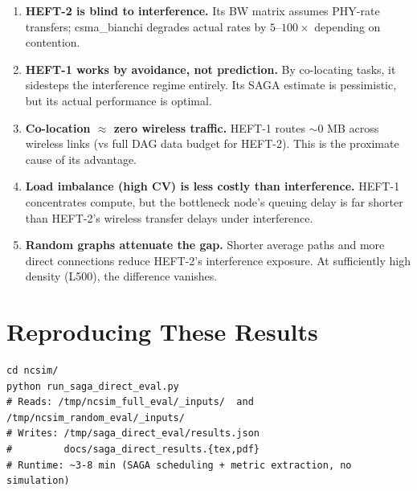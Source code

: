 \documentclass[11pt]{article}
\begin{document}
\begin{enumerate}
  \item \textbf{HEFT-2 is blind to interference.}  Its BW matrix assumes
        PHY-rate transfers; csma\_bianchi degrades actual rates by $5\text{--}100\times$
        depending on contention.
  \item \textbf{HEFT-1 works by avoidance, not prediction.}  By co-locating tasks,
        it sidesteps the interference regime entirely.  Its SAGA estimate is
        pessimistic, but its actual performance is optimal.
  \item \textbf{Co-location $\approx$ zero wireless traffic.}  HEFT-1 routes
        $\sim$0 MB across wireless links (vs full DAG data budget for HEFT-2).
        This is the proximate cause of its advantage.
  \item \textbf{Load imbalance (high CV) is less costly than interference.}
        HEFT-1 concentrates compute, but the bottleneck node's queuing delay is
        far shorter than HEFT-2's wireless transfer delays under interference.
  \item \textbf{Random graphs attenuate the gap.}  Shorter average paths and
        more direct connections reduce HEFT-2's interference exposure.  At
        sufficiently high density (L500), the difference vanishes.
\end{enumerate}


\section{Reproducing These Results}

\begin{verbatim}
cd ncsim/
python run_saga_direct_eval.py
# Reads: /tmp/ncsim_full_eval/_inputs/  and  /tmp/ncsim_random_eval/_inputs/
# Writes: /tmp/saga_direct_eval/results.json
#         docs/saga_direct_results.{tex,pdf}
# Runtime: ~3-8 min (SAGA scheduling + metric extraction, no simulation)
\end{verbatim}
\end{document}
